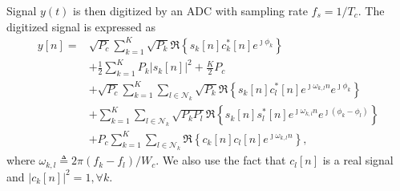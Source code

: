 \documentclass{IEEEtran}
\begin{document}
Signal $y(t)$ is then digitized by an ADC with sampling rate $f_s = 1/T_c$. The digitized signal is expressed as
\begin{align}
y [n]= & \sqrt{P_c}\sum\limits_{k=1}^{K}\sqrt{P_{k}} \Re \left\{s_{k}[n]c^*_{k}[n]e^{\jmath \phi_{k}}\right\}\nonumber\\
&+\frac{1}{2}\sum\limits_{k=1}^{K}P_{k} |s_{k}[n]|^2+\frac{K}{2}P_c\nonumber\\
&+\sqrt{P_c}\sum\limits_{k=1}^{K}\sum_{l\in \mathcal{N}_k}\sqrt{P_{k}}\Re \left\{s_{k}[n]c^*_{l}[n]e^{\jmath \omega_{k,l} n}e^{\jmath \phi_{k}}\right\}\nonumber\\
&+\sum\limits_{k=1}^{K}\sum_{l\in \mathcal{N}_k} \sqrt{P_{k}P_{l}} \Re \left\{s_{k}[n]s_{l}^*[n]e^{\jmath \omega_{k,l} n}e^{\jmath \left(\phi_{k}-\phi_{l}\right)}\right\}\nonumber\\
&+P_c\sum\limits_{k=1}^{K}\sum_{l\in \mathcal{N}_k} \Re \left\{c_{k}[n]c_{l}[n]e^{\jmath \omega_{k,l}n}\right\},
\label{eq:y_of_n}
\end{align}
where $\omega_{k,l} \triangleq 2\pi(f_k-f_l)/W_c$. We also use the fact that $c_l[n]$ is a real signal and $|c_k[n]|^2=1, \forall k$.
\end{document}
